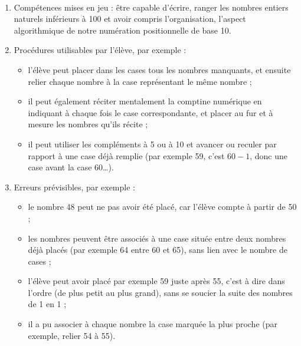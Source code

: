 \ \\ [-5mm]
\begin{enumerate}
   \item Compétences mises en jeu : être capable d'écrire, ranger les nombres entiers naturels inférieurs à 100 et avoir compris l'organisation, l'aspect algorithmique de notre numération positionnelle de base 10.
   \item Procédures utilisables par l'élève, par exemple :
   \begin{itemize}
      \item l'élève peut placer dans les cases tous les nombres manquants, et ensuite relier chaque nombre à la case représentant le même nombre ;
      \item il peut également réciter \og mentalement \fg{} la comptine numérique en indiquant à chaque fois le case correspondante, et placer au fur et à mesure les nombres qu'ils récite ;
      \item il peut utiliser les compléments à 5 ou à 10 et avancer ou reculer par rapport à une case déjà remplie (par exemple 59, c'est $60-1$, donc une case avant la case 60\dots).
   \end{itemize}
   \item Erreurs prévisibles, par exemple :
   \begin{itemize}
      \item le nombre 48 peut ne pas avoir été placé, car l'élève compte à partir de 50 ;
      \item les nombres peuvent être associés à une case située \og entre \fg{} deux nombres déjà placés (par exemple 64 entre 60 et 65), sans lien avec le nombre de cases ;
      \item l'élève peut avoir placé par exemple 59 juste après 55, c'est à dire dans l'ordre (de plus petit au plus grand), sans se soucier la suite des nombres de 1 en 1 ;
      \item il a pu associer à chaque nombre la case marquée \og la plus proche \fg{} (par exemple, relier 54 à 55).
   \end{itemize}
\end{enumerate}

